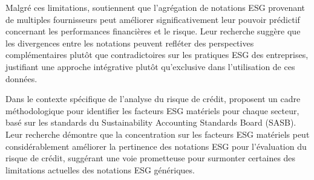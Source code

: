 Malgré ces limitations, \citet{gibson2021} soutiennent que l'agrégation de notations ESG provenant de multiples fournisseurs peut améliorer significativement leur pouvoir prédictif concernant les performances financières et le risque. Leur recherche suggère que les divergences entre les notations peuvent refléter des perspectives complémentaires plutôt que contradictoires sur les pratiques ESG des entreprises, justifiant une approche intégrative plutôt qu'exclusive dans l'utilisation de ces données.

Dans le contexte spécifique de l'analyse du risque de crédit, \citet{khan2021} proposent un cadre méthodologique pour identifier les facteurs ESG matériels pour chaque secteur, basé sur les standards du Sustainability Accounting Standards Board (SASB). Leur recherche démontre que la concentration sur les facteurs ESG matériels peut considérablement améliorer la pertinence des notations ESG pour l'évaluation du risque de crédit, suggérant une voie prometteuse pour surmonter certaines des limitations actuelles des notations ESG génériques.